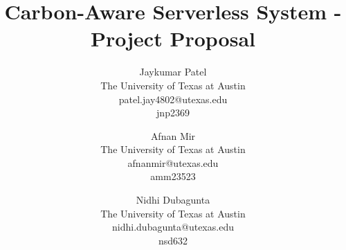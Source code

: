\documentclass[times, 10pt]{article}
\begin{document}
\title{Carbon-Aware Serverless System - Project Proposal}

\author{Jaykumar Patel\\
The University of Texas at Austin\\
patel.jay4802@utexas.edu\\
jnp2369 \\
\and
Afnan Mir\\
The University of Texas at Austin\\
afnanmir@utexas.edu\\
amm23523\\
\and
Nidhi Dubagunta\\
The University of Texas at Austin\\
nidhi.dubagunta@utexas.edu\\
nsd632
}



\maketitle
\thispagestyle{empty}
\end{document}
